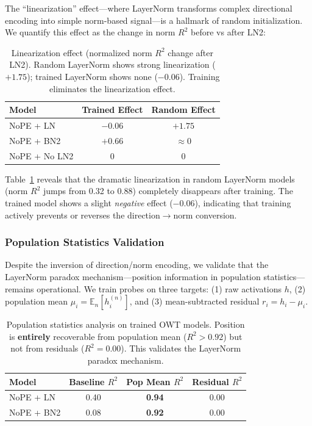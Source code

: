 \documentclass[11pt]{article}
\begin{document}
The ``linearization'' effect---where LayerNorm transforms complex directional encoding into simple norm-based signal---is a hallmark of random initialization. We quantify this effect as the change in norm $R^2$ before vs after LN2:

\begin{table}[htbp]
\centering
\small
\begin{tabular}{lcc}
\toprule
\textbf{Model} & \textbf{Trained Effect} & \textbf{Random Effect} \\
\midrule
NoPE + LN & $-0.06$ & $+1.75$ \\
NoPE + BN2 & $+0.66$ & $\approx 0$ \\
NoPE + No LN2 & $0$ & $0$ \\
\bottomrule
\end{tabular}
\caption{Linearization effect (normalized norm $R^2$ change after LN2). Random LayerNorm shows strong linearization ($+1.75$); trained LayerNorm shows none ($-0.06$). Training eliminates the linearization effect.}
\label{tab:owt-linearization}
\end{table}

Table~\ref{tab:owt-linearization} reveals that the dramatic linearization in random LayerNorm models (norm $R^2$ jumps from 0.32 to 0.88) completely disappears after training. The trained model shows a slight \textit{negative} effect ($-0.06$), indicating that training actively prevents or reverses the direction$\rightarrow$norm conversion.

\subsubsection{Population Statistics Validation}

Despite the inversion of direction/norm encoding, we validate that the LayerNorm paradox mechanism---position information in population statistics---remains operational. We train probes on three targets: (1) raw activations $h$, (2) population mean $\mu_i = \mathbb{E}_n[h_i^{(n)}]$, and (3) mean-subtracted residual $r_i = h_i - \mu_i$.

\begin{table}[htbp]
\centering
\small
\begin{tabular}{lccc}
\toprule
\textbf{Model} & \textbf{Baseline $R^2$} & \textbf{Pop Mean $R^2$} & \textbf{Residual $R^2$} \\
\midrule
NoPE + LN & 0.40 & \textbf{0.94} & 0.00 \\
NoPE + BN2 & 0.08 & \textbf{0.92} & 0.00 \\
\bottomrule
\end{tabular}
\caption{Population statistics analysis on trained OWT models. Position is \textbf{entirely} recoverable from population mean ($R^2 > 0.92$) but not from residuals ($R^2 = 0.00$). This validates the LayerNorm paradox mechanism.}
\label{tab:owt-population}
\end{table}
\end{document}
